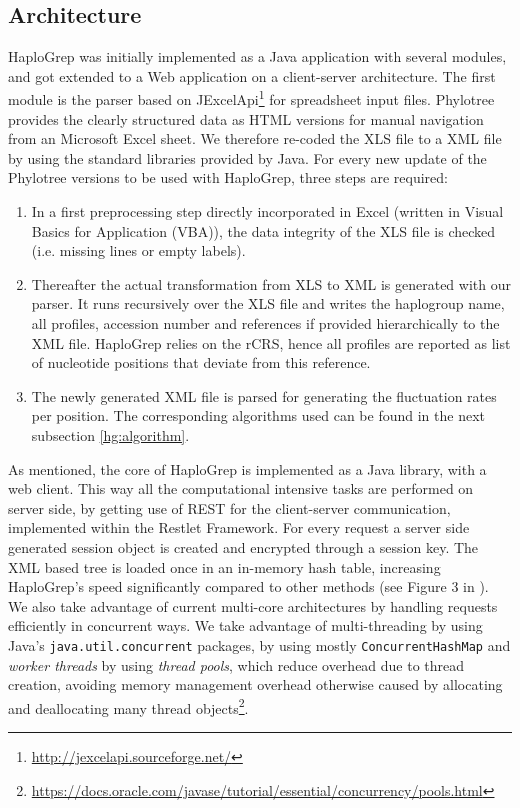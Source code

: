 \subsection{Architecture}
HaploGrep was initially implemented as a Java application with several modules, and got extended to a Web application on a client-server architecture. The first module is the parser based on JExcelApi\footnote{\url{http://jexcelapi.sourceforge.net/}} for spreadsheet input files. Phylotree provides the clearly structured data as HTML versions for manual navigation from an Microsoft Excel sheet. We therefore re-coded the XLS file to a XML file by using the standard libraries provided by Java. For every new update of the Phylotree versions to be used with HaploGrep, three steps are required: 
\begin{enumerate}
\item In a first preprocessing step directly incorporated in Excel (written in Visual Basics for Application (VBA)), the data integrity of the XLS file is checked (i.e. missing lines or empty labels). 
\item Thereafter the actual transformation from XLS to XML is generated with our parser. It runs recursively over the XLS file and writes the haplogroup name, all profiles, accession number and references if provided hierarchically to the XML file. HaploGrep relies on the rCRS, hence all profiles are reported as list of nucleotide positions that deviate from this reference. 
\item The newly generated XML file is parsed for generating the fluctuation rates per position. The corresponding algorithms used can be found in the next subsection \ref{hg:algorithm}.
\end{enumerate}
As mentioned, the core of HaploGrep is implemented as a Java library, with a web client. This way all the computational intensive tasks are performed on server side, by getting use of REST for the client-server communication, implemented within the Restlet Framework. For every request a server side generated session object is created and encrypted through a session key. The XML based tree is loaded once in an in-memory hash table, increasing HaploGrep's speed significantly compared to other methods (see Figure 3 in \cite{Kloss-Brandstatter2011}). We also take advantage of current multi-core architectures by handling requests efficiently in concurrent ways. We take advantage of multi-threading by using Java's \verb|java.util.concurrent| packages, by using mostly \verb|ConcurrentHashMap| and \textit{worker threads} by using \textit{thread pools}, which reduce overhead due to thread creation, avoiding memory management overhead otherwise caused by allocating and deallocating many thread objects\footnote{\url{https://docs.oracle.com/javase/tutorial/essential/concurrency/pools.html}}. \\
